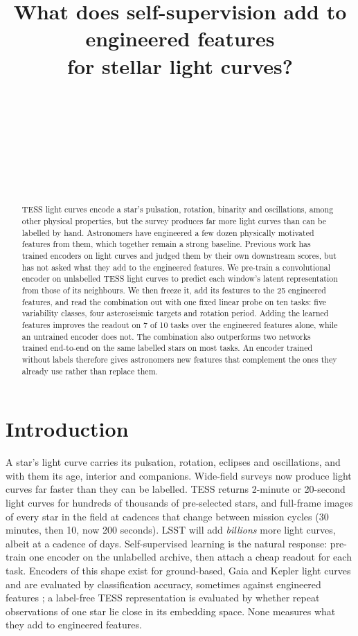 \documentclass{article}
\title{What does self-supervision add to engineered features\\for stellar light curves?}
\author{\DIFdelbegin \DIFdel{Anonymous Author(s)}\DIFdelend %
  \DIFaddbegin \DIFadd{Zijun Liu}\DIFaddend \\
  \DIFdelbegin \DIFdel{Affiliation}\DIFdelend \DIFaddbegin \DIFadd{University of California, San Diego}\DIFaddend \\
  \DIFdelbegin \DIFdel{Address}\DIFdelend \DIFaddbegin \DIFadd{\texttt{brl055@ucsd.edu}}\DIFaddend \\
  \DIFdelbegin \DIFdel{\texttt{email}}\DIFdelend \DIFaddbegin \DIFadd{\texttt{liuzijun6688@gmail.com}
  }\And
  \DIFadd{Yue Ma}\\
  \DIFadd{Hal\i c\i o\u{g}lu Data Science Institute}\\
  \DIFadd{University of California, San Diego
  }\And
  \DIFadd{Christopher A. Theissen}\\
  \DIFadd{Department of Astronomy and Astrophysics}\\
  \DIFadd{University of California, San Diego
}\DIFaddend }
\begin{document}
\maketitle

\begin{abstract}
TESS light curves encode a star's pulsation, rotation, binarity and oscillations, among other physical
properties, but the survey
produces far more light curves than can be labelled by hand. Astronomers have engineered a few
dozen physically motivated features from them, which together remain a strong baseline. Previous work has trained
encoders on light curves and judged them by their own downstream scores, but has not asked what
they add to the engineered features. We pre-train a convolutional encoder on unlabelled TESS light curves to predict each
window's latent representation from those of its neighbours. We then freeze it, add its features to
the 25 engineered features, and read the combination out with one fixed linear probe on ten tasks:
five variability classes, four asteroseismic targets and rotation period. Adding the learned features
improves the readout on 7 of 10 tasks over the engineered features alone, while an untrained encoder
does not. The combination also outperforms two networks trained end-to-end on the same labelled
stars on most tasks. An encoder trained without labels therefore gives astronomers new features
that complement the ones they already use rather than replace them.
\end{abstract}

\section{Introduction}

A star's light curve carries its pulsation, rotation, eclipses and oscillations, and with them its
age, interior and companions. Wide-field surveys now produce light curves far faster
than they can be labelled. TESS
\citep{ricker2015} returns 2-minute or 20-second \citep{huber2022} light curves for hundreds of
thousands of pre-selected stars, and full-frame images of every star in the field at cadences that
change between mission cycles (30 minutes, then 10, now 200 seconds). LSST \citep{ivezic2019}
will add \emph{billions} more light curves, albeit at a cadence of days. Self-supervised learning is the
natural response: pre-train one encoder on the unlabelled archive, then attach a cheap readout for
each task. Encoders of this shape exist for ground-based, Gaia and Kepler light curves
\citep{donoso2025astromer2,zuo2025falco,rui2026jepa} and are evaluated by classification accuracy,
sometimes against engineered features \citep{rui2026jepa}; a label-free TESS representation
\citep{poznanski2026} is evaluated by whether repeat observations of one star lie close in its embedding space.
None measures what they add to engineered features.
\end{document}
